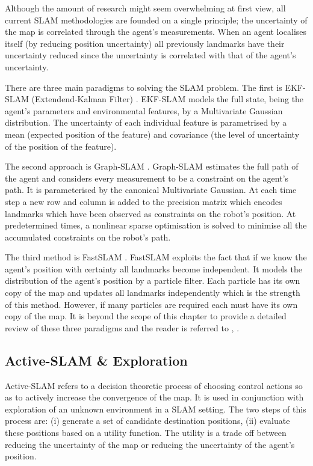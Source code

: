 
Although the amount of research might seem overwhelming at first view, all current SLAM methodologies are founded on a single principle; 
the uncertainty of the map is correlated through the agent's measurements. When an agent localises itself (by reducing position uncertainty)
all previously landmarks have their uncertainty reduced since the uncertainty is correlated with that of the agent's uncertainty.


There are three main paradigms to solving the SLAM problem. The first is EKF-SLAM (Extendend-Kalman Filter) \cite{SLAM_part1}.
EKF-SLAM models the full state, being the agent's parameters and environmental features, by a Multivariate Gaussian distribution. 
The uncertainty of each individual feature is parametrised by a mean (expected position of the feature) and covariance 
(the level of uncertainty of the position of the feature).

The second approach is Graph-SLAM \cite{TutGraphSLAM}. Graph-SLAM estimates the full path of the agent and considers every measurement to 
be a constraint on the agent's path. It is parameterised by the canonical Multivariate Gaussian. At each time step a new row and column 
is added to the precision matrix which encodes landmarks which have been observed as constraints on the robot's position.
At predetermined times, a nonlinear sparse optimisation is solved to minimise all the accumulated constraints on the robot's path.

The third method is FastSLAM \cite{FastSLAM}. FastSLAM exploits the fact that if we know the agent's position with 
certainty all landmarks become independent. It models the distribution of the agent's position by a particle filter. Each particle
has its own copy of the map and updates all landmarks independently which is the strength of this method. 
However, if many particles are required each must have its own copy of the map. 
It is beyond the scope of this chapter to provide a detailed review of these  three paradigms and the reader is referred to \cite{Thrun_Burgard_Fox_2005}, \cite{SLAM_HBR}.

\subsection{Active-SLAM \& Exploration}

Active-SLAM refers to a decision theoretic process of choosing control actions so as to actively 
increase the convergence of the map. It is used in conjunction with exploration of an unknown environment
in a SLAM setting. The two steps of this process are: (i) generate a set of 
candidate destination positions, (ii) evaluate these positions based on a utility function. The utility  
is a trade off between reducing the uncertainty of the map or reducing the uncertainty
of the agent's position.


